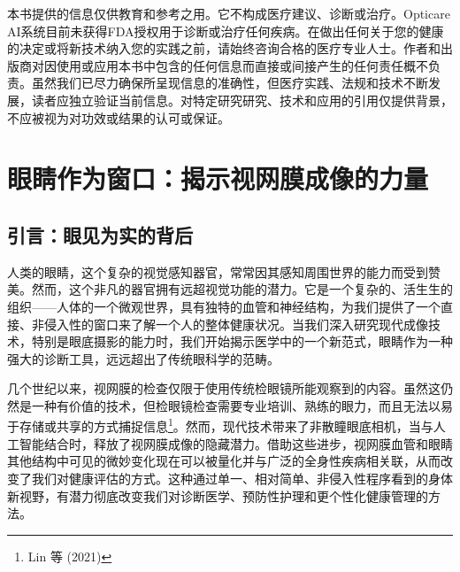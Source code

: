 \documentclass[
  Letterpaper,
]{scrbook}
\begin{document}
\begin{tcolorbox}[enhanced jigsaw, coltitle=black, rightrule=.15mm, colback=white, colbacktitle=quarto-callout-caution-color!10!white, breakable, bottomtitle=1mm, opacityback=0, bottomrule=.15mm, titlerule=0mm, opacitybacktitle=0.6, left=2mm, colframe=quarto-callout-caution-color-frame, title=\textcolor{quarto-callout-caution-color}{\faFire}\hspace{0.5em}{免责声明}, toptitle=1mm, toprule=.15mm, arc=.35mm, leftrule=.75mm]

本书提供的信息仅供教育和参考之用。它不构成医疗建议、诊断或治疗。Opticare
AI系统目前未获得FDA授权用于诊断或治疗任何疾病。在做出任何关于您的健康的决定或将新技术纳入您的实践之前，请始终咨询合格的医疗专业人士。作者和出版商对因使用或应用本书中包含的任何信息而直接或间接产生的任何责任概不负责。虽然我们已尽力确保所呈现信息的准确性，但医疗实践、法规和技术不断发展，读者应独立验证当前信息。对特定研究研究、技术和应用的引用仅提供背景，不应被视为对功效或结果的认可或保证。

\end{tcolorbox}


\chapter{眼睛作为窗口：揭示视网膜成像的力量}\label{ux773cux775bux4f5cux4e3aux7a97ux53e3ux63edux793aux89c6ux7f51ux819cux6210ux50cfux7684ux529bux91cf}

\section{引言：眼见为实的背后}\label{ux5f15ux8a00ux773cux89c1ux4e3aux5b9eux7684ux80ccux540e}

人类的眼睛，这个复杂的视觉感知器官，常常因其感知周围世界的能力而受到赞美。然而，这个非凡的器官拥有远超视觉功能的潜力。它是一个复杂的、活生生的组织------人体的一个微观世界，具有独特的血管和神经结构，为我们提供了一个直接、非侵入性的窗口来了解一个人的整体健康状况。当我们深入研究现代成像技术，特别是眼底摄影的能力时，我们开始揭示医学中的一个新范式，眼睛作为一种强大的诊断工具，远远超出了传统眼科学的范畴。

几个世纪以来，视网膜的检查仅限于使用传统检眼镜所能观察到的内容。虽然这仍然是一种有价值的技术，但检眼镜检查需要专业培训、熟练的眼力，而且无法以易于存储或共享的方式捕捉信息\footnote{Lin
  等 (2021)}。然而，现代技术带来了非散瞳眼底相机，当与人工智能结合时，释放了视网膜成像的隐藏潜力。借助这些进步，视网膜血管和眼睛其他结构中可见的微妙变化现在可以被量化并与广泛的全身性疾病相关联，从而改变了我们对健康评估的方式。这种通过单一、相对简单、非侵入性程序看到的身体新视野，有潜力彻底改变我们对诊断医学、预防性护理和更个性化健康管理的方法。
\end{document}
